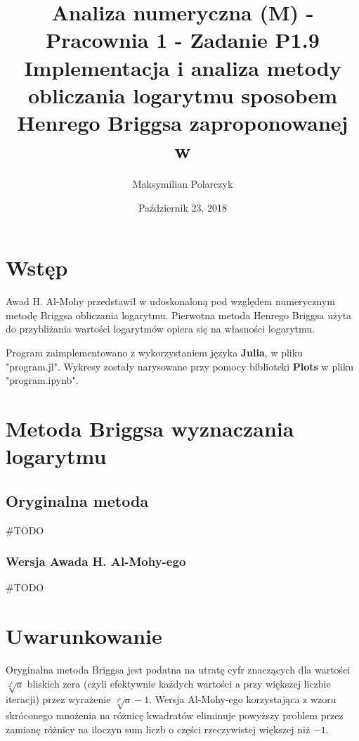 \documentclass{article}
\begin{document}
\title{Analiza numeryczna (M) - Pracownia 1 - Zadanie P1.9\\
Implementacja i analiza metody obliczania logarytmu sposobem Henrego Briggsa zaproponowanej w \cite{al-mohy11}\\}
\date{Październik 23, 2018}
\author{Maksymilian Polarczyk}
\maketitle

\section{Wstęp}

Awad H. Al-Mohy przedstawił w \cite{al-mohy11} udoskonaloną pod względem numerycznym metodę Briggsa obliczania logarytmu. Pierwotna metoda Henrego Briggsa użyta do przybliżania wartości logarytmów opiera się na własności logarytmu.

Program zaimplementowano z wykorzystaniem języka \textbf{Julia}, w pliku "program.jl". Wykresy zostały narysowane przy pomocy biblioteki \textbf{Plots} w pliku "program.ipynb".



\section{Metoda Briggsa wyznaczania logarytmu}
\subsection{Oryginalna metoda}
	\#TODO 
\subsubsection{Wersja Awada H. Al-Mohy-ego}
	\#TODO
\pagebreak

\section{Uwarunkowanie}
Oryginalna metoda Briggsa jest podatna na utratę cyfr znaczących dla wartości $\sqrt[2^k]{a}$ bliskich zera (czyli efektywnie każdych wartości $\mathrm{a}$ przy większej liczbie iteracji) przez wyrażenie $\sqrt[2^k]{a} - 1$. Wersja Al-Mohy-ego korzystająca z wzoru skróconego mnożenia na różnicę kwadratów eliminuje powyższy problem przez zamianę różnicy na iloczyn sum liczb o części rzeczywistej większej niż $\mathrm{-1}$. 
	
\end{document}
